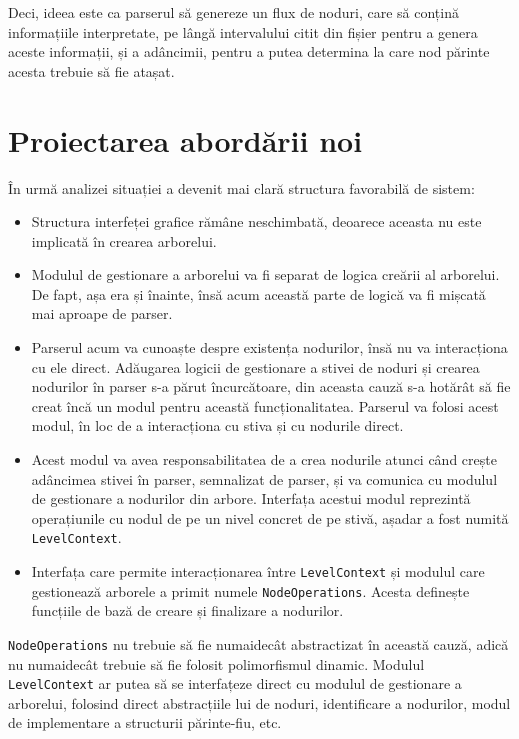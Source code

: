 \documentclass[a4paper,12pt]{report}
\begin{document}
Deci, ideea este ca parserul să genereze un flux de noduri,
care să conțină informațiile interpretate,
pe lângă intervalului citit din fișier pentru a genera aceste informații,
și a adâncimii, pentru a putea determina la care nod părinte acesta trebuie să fie atașat.

\section{Proiectarea abordării noi}

În urmă analizei situației a devenit mai clară structura favorabilă de sistem:
\begin{itemize}
    \item 
        Structura interfeței grafice rămâne neschimbată, 
        deoarece aceasta nu este implicată în crearea arborelui.

    \item
        Modulul de gestionare a arborelui va fi separat de logica creării al arborelui.
        De fapt, așa era și înainte, însă acum această parte de logică va fi mișcată mai aproape de parser.
        
    \item
        Parserul acum va cunoaște despre existența nodurilor, însă nu va interacționa cu ele direct.
        Adăugarea logicii de gestionare a stivei de noduri și crearea nodurilor în parser s-a părut încurcătoare,
        din aceasta cauză s-a hotărât să fie creat încă un modul pentru această funcționalitatea.
        Parserul va folosi acest modul, în loc de a interacționa cu stiva și cu nodurile direct.

    \item
        Acest modul va avea responsabilitatea de a crea nodurile atunci când crește adâncimea stivei în parser,
        semnalizat de parser, și va comunica cu modulul de gestionare a nodurilor din arbore.
        Interfața acestui modul reprezintă operațiunile cu nodul de pe un nivel concret de pe stivă, 
        așadar a fost numită \texttt{LevelContext}.

    \item
        Interfața care permite interacționarea între \texttt{LevelContext}
        și modulul care gestionează arborele a primit numele \texttt{NodeOperations}.
        Acesta definește funcțiile de bază de creare și finalizare a nodurilor.
\end{itemize}

\texttt{NodeOperations} nu trebuie să fie numaidecât abstractizat în această cauză,
adică nu numaidecât trebuie să fie folosit polimorfismul dinamic.
Modulul \texttt{LevelContext} ar putea să se interfațeze direct cu modulul de gestionare a arborelui,
folosind direct abstracțiile lui de noduri, identificare a nodurilor,
modul de implementare a structurii părinte-fiu, etc.
\end{document}
